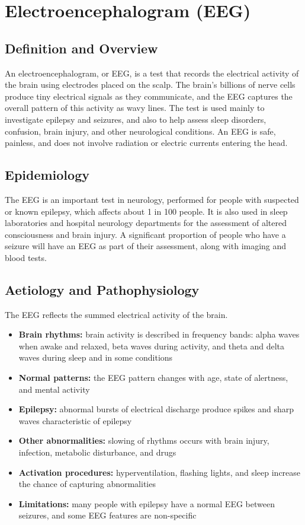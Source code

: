 \chapter{Electroencephalogram (EEG)}

\section*{Definition and Overview}
An electroencephalogram, or EEG, is a test that records the electrical activity of the brain using electrodes placed on the scalp. The brain's billions of nerve cells produce tiny electrical signals as they communicate, and the EEG captures the overall pattern of this activity as wavy lines. The test is used mainly to investigate epilepsy and seizures, and also to help assess sleep disorders, confusion, brain injury, and other neurological conditions. An EEG is safe, painless, and does not involve radiation or electric currents entering the head.

\section*{Epidemiology}
The EEG is an important test in neurology, performed for people with suspected or known epilepsy, which affects about 1 in 100 people. It is also used in sleep laboratories and hospital neurology departments for the assessment of altered consciousness and brain injury. A significant proportion of people who have a seizure will have an EEG as part of their assessment, along with imaging and blood tests.

\section*{Aetiology and Pathophysiology}
The EEG reflects the summed electrical activity of the brain.
\begin{itemize}
    \item \textbf{Brain rhythms:} brain activity is described in frequency bands: alpha waves when awake and relaxed, beta waves during activity, and theta and delta waves during sleep and in some conditions
    \item \textbf{Normal patterns:} the EEG pattern changes with age, state of alertness, and mental activity
    \item \textbf{Epilepsy:} abnormal bursts of electrical discharge produce spikes and sharp waves characteristic of epilepsy
    \item \textbf{Other abnormalities:} slowing of rhythms occurs with brain injury, infection, metabolic disturbance, and drugs
    \item \textbf{Activation procedures:} hyperventilation, flashing lights, and sleep increase the chance of capturing abnormalities
    \item \textbf{Limitations:} many people with epilepsy have a normal EEG between seizures, and some EEG features are non-specific
\end{itemize}

